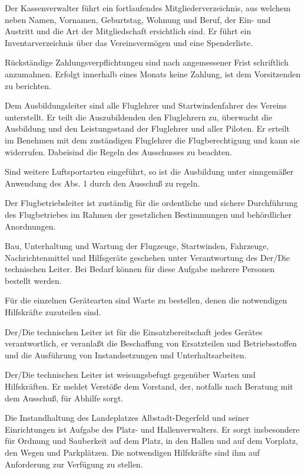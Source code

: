 \documentclass[10pt,a4paper,parskip=half]{scrartcl}
\begin{document}
\begin{contract}
    Der Kassenverwalter führt ein fortlaufendes Mitgliederverzeichnis,
    aus welchem neben Namen,
    Vornamen,
    Geburtstag,
    Wohnung und Beruf,
    der Ein- und Austritt und die Art der Mitgliedschaft ersichtlich sind.
    Er führt ein Inventarverzeichnis über das Vereinsvermögen und eine Spenderliste.
    
    Rückständige Zahlungsverpflichtungen sind nach angemessener Frist schriftlich anzumahnen.
    Erfolgt innerhalb eines Monats keine Zahlung,
    ist dem Vorsitzenden zu berichten.
    
    Dem Ausbildungsleiter sind alle Fluglehrer und Startwindenfahrer des Vereins unterstellt.
    Er teilt die Auszubildenden den Fluglehrern zu,
    überwacht die Ausbildung und den Leistungsstand der Fluglehrer und aller Piloten.
    Er erteilt im Benehmen mit dem zuständigen Fluglehrer die Flugberechtigung und kann sie widerrufen.
    Dabeisind die Regeln des Ausschusses zu beachten.
    
    Sind weitere Luftsportarten eingeführt,
    so ist die Ausbildung unter sinngemäßer Anwendung des Abs. 1 durch den Ausschuß zu regeln.
    
    Der Flugbetriebsleiter ist zuständig für die ordentliche und sichere Durchführung des Flugbetriebes im Rahmen der gesetzlichen Bestimmungen und behördlicher Anordnungen.
    
    Bau,
    Unterhaltung und Wartung der Flugzeuge,
    Startwinden,
    Fahrzeuge,
    Nachrichtenmittel und Hilfsgeräte geschehen unter Verantwortung des Der/Die technischen Leiter.
    Bei Bedarf können für diese Aufgabe mehrere Personen bestellt werden.
    
    Für die einzelnen Gerätearten sind Warte zu bestellen,
    denen die notwendigen Hilfskräfte zuzuteilen sind.
    
    Der/Die technischen Leiter ist für die Einsatzbereitschaft jedes Gerätes verantwortlich,
    er veranlaßt die Beschaffung von Ersatzteilen und Betriebsstoffen und die Ausführung von Instandsetzungen und Unterhaltsarbeiten.
    
    Der/Die technischen Leiter ist weisungsbefugt gegenüber Warten und Hilfskräften.
    Er meldet Verstöße dem Vorstand,
    der,
    notfalls nach Beratung mit dem Ausschuß,
    für Abhilfe sorgt.
    
    Die Instandhaltung des Landeplatzes Albstadt-Degerfeld und seiner Einrichtungen ist Aufgabe des Platz- und Hallenverwalters.
    Er sorgt insbesondere für Ordnung und Sauberkeit auf dem Platz,
    in den Hallen und auf dem Vorplatz,
    den Wegen und Parkplätzen.
    Die notwendigen Hilfskräfte sind ihm auf Anforderung zur Verfügung zu stellen.
    

\end{contract}
\end{document}
